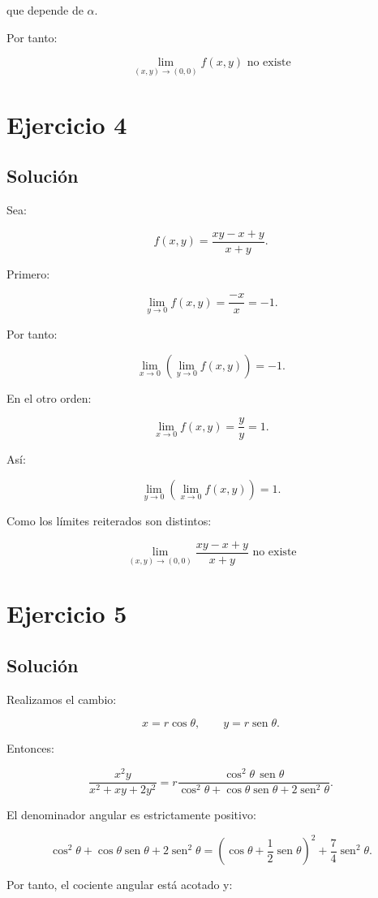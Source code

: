 \documentclass[11pt,a4paper]{article}
\newcommand{\sen}{\operatorname{sen}}
\begin{document}
que depende de \(\alpha\).

Por tanto:

\[
\boxed{
\lim_{(x,y)\to(0,0)}f(x,y)
\text{ no existe}
}
\]

\section{Ejercicio 4}
\subsection{Solución}

Sea:

\[
f(x,y)
=
\frac{xy-x+y}{x+y}.
\]

Primero:

\[
\lim_{y\to0}f(x,y)
=
\frac{-x}{x}
=
-1.
\]

Por tanto:

\[
\lim_{x\to0}
\left(
\lim_{y\to0}f(x,y)
\right)
=
-1.
\]

En el otro orden:

\[
\lim_{x\to0}f(x,y)
=
\frac{y}{y}
=
1.
\]

Así:

\[
\lim_{y\to0}
\left(
\lim_{x\to0}f(x,y)
\right)
=
1.
\]

Como los límites reiterados son distintos:

\[
\boxed{
\lim_{(x,y)\to(0,0)}
\frac{xy-x+y}{x+y}
\text{ no existe}
}
\]

\section{Ejercicio 5}
\subsection{Solución}

Realizamos el cambio:

\[
x=r\cos\theta,
\qquad
y=r\sen\theta.
\]

Entonces:

\[
\frac{x^2y}{x^2+xy+2y^2}
=
r
\frac{\cos^2\theta\,\sen\theta}
{\cos^2\theta+\cos\theta\sen\theta+2\sen^2\theta}.
\]

El denominador angular es estrictamente positivo:

\[
\cos^2\theta+\cos\theta\sen\theta+2\sen^2\theta
=
\left(
\cos\theta+\frac12\sen\theta
\right)^2
+
\frac74\sen^2\theta.
\]

Por tanto, el cociente angular está acotado y:
\end{document}
